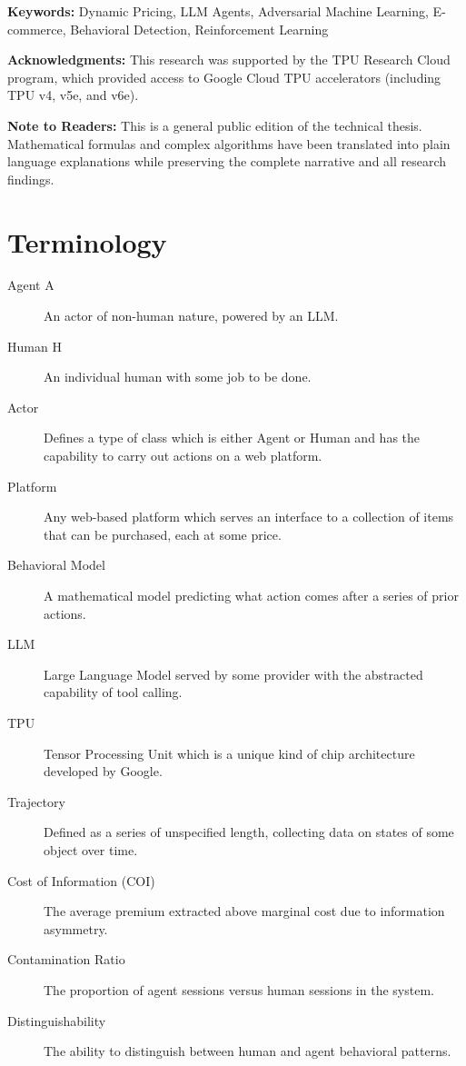 \documentclass[12pt,letterpaper]{article}
\begin{document}
\noindent\textbf{Keywords:} Dynamic Pricing, LLM Agents, Adversarial Machine Learning, E-commerce, Behavioral Detection, Reinforcement Learning

\vspace{1em}
\noindent\textbf{Acknowledgments:} This research was supported by the TPU Research Cloud program, which provided access to Google Cloud TPU accelerators (including TPU v4, v5e, and v6e).

\vspace{1em}
\noindent\textbf{Note to Readers:} This is a general public edition of the technical thesis. Mathematical formulas and complex algorithms have been translated into plain language explanations while preserving the complete narrative and all research findings.

\clearpage







\printbibliography

\clearpage
\appendix
\section{Terminology}
\begin{description}
\item[Agent A] An actor of non-human nature, powered by an LLM.
\item[Human H] An individual human with some job to be done.
\item[Actor] Defines a type of class which is either Agent or Human and has the capability to carry out actions on a web platform.
\item[Platform] Any web-based platform which serves an interface to a collection of items that can be purchased, each at some price.
\item[Behavioral Model] A mathematical model predicting what action comes after a series of prior actions.
\item[LLM] Large Language Model served by some provider with the abstracted capability of tool calling.
\item[TPU] Tensor Processing Unit which is a unique kind of chip architecture developed by Google.
\item[Trajectory] Defined as a series of unspecified length, collecting data on states of some object over time.
\item[Cost of Information (COI)] The average premium extracted above marginal cost due to information asymmetry.
\item[Contamination Ratio] The proportion of agent sessions versus human sessions in the system.
\item[Distinguishability] The ability to distinguish between human and agent behavioral patterns.
\end{description}
\end{document}
